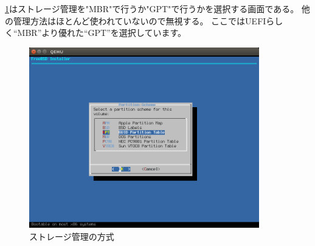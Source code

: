 \documentclass[a4j]{jarticle}
\begin{document}
\ref{fig:FreeBSD_GPT}はストレージ管理を"MBR"で行うか"GPT"で行うかを選択する画面である。
他の管理方法はほとんど使われていないので無視する。
ここではUEFIらしく``MBR''より優れた``GPT''を選択しています。
\begin{figure}[htbp]
	\begin{center}
    	\includegraphics[width=10cm]{./IMG/FreeBSD_GPT.png}
	\end{center}
    \caption{ストレージ管理の方式}
    \label{fig:FreeBSD_GPT}
\end{figure}
\end{document}
